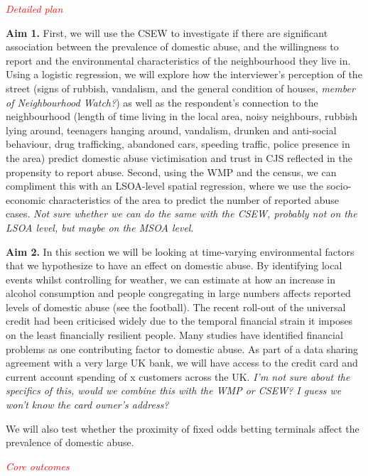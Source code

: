 \documentclass[11pt, a4paper]{article}
\begin{document}
\textcolor{red}{\textit{Detailed plan}}

\textbf{Aim 1.} First, we will use the CSEW to investigate if there are significant association between the prevalence of domestic abuse, and the willingness to report and the environmental characteristics of the neighbourhood they live in. Using a logistic regression, we will explore how the interviewer's perception of the street (signs of rubbish, vandalism, and the general condition of houses, \textit{member of Neighbourhood Watch?}) as well as the respondent's connection to the neighbourhood (length of time living in the local area, noisy neighbours, rubbish lying around, teenagers hanging around, vandalism, drunken and anti-social behaviour, drug trafficking, abandoned cars, speeding traffic, police presence in the area) predict domestic abuse victimisation and trust in CJS reflected in the propensity to report abuse. Second, using the WMP and the census, we can compliment this with an LSOA-level spatial regression, where we use the socio-economic characteristics of the area to predict the number of reported abuse cases. \textit{Not sure whether we can do the same with the CSEW, probably not on the LSOA level, but maybe on the MSOA level}.

\textbf{Aim 2.} In this section we will be looking at time-varying environmental factors that we hypothesize to have an effect on domestic abuse. By identifying local events whilst controlling for weather, we can estimate at how an increase in alcohol consumption and people congregating in large numbers affects reported levels of domestic abuse (see the football).  The recent roll-out of the universal credit had been criticised widely due to the temporal financial strain it imposes on the least financially resilient people. Many studies have identified financial problems as one contributing factor to domestic abuse. As part of a data sharing agreement with a very large UK bank, we will have access to the credit card and current account spending of x customers across the UK. \textit{I'm not sure about the specifics of this, would we combine this with the WMP or CSEW? I guess we won't know the card owner's address?}

We will also test whether the proximity of fixed odds betting terminals affect the prevalence of domestic abuse.

\textcolor{red}{\textit{Core outcomes}}
%
%
%
%
%
%
%
%
%
\end{document}
